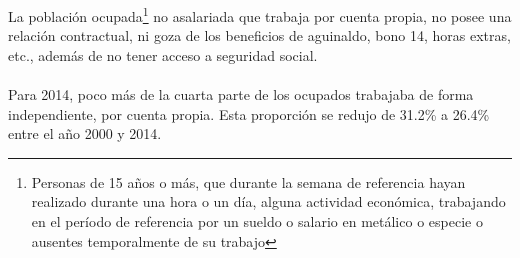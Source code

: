 La población ocupada\footnote{Personas de 15 años o más, que durante la semana de referencia hayan realizado durante una hora o un día, alguna actividad económica, trabajando en el período de referencia por un sueldo o salario en metálico o especie o ausentes temporalmente de su trabajo} no asalariada que trabaja por cuenta propia, no posee una relación contractual, ni goza de los beneficios de aguinaldo, bono 14, horas extras, etc., además de no tener acceso a seguridad social.\\\\
 Para 2014, poco más de la cuarta parte de los ocupados trabajaba de forma independiente, por cuenta propia. Esta proporción se redujo de 31.2\% a 26.4\% entre  el año 2000 y  2014.